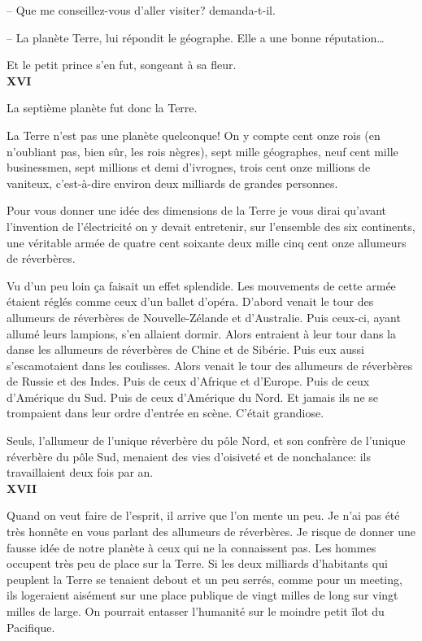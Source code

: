 \begin{Parallel}[p]{}{}
{-- Que me conseillez-vous d'aller visiter? demanda-t-il.

-- La planète Terre, lui répondit le géographe.
Elle a une bonne réputation\ldots{}

Et le petit prince s'en fut, songeant à sa fleur.\\

\textbf{XVI}

La septième planète fut donc la Terre.

La Terre n'est pas une planète quelconque! On y
compte cent onze rois (en n'oubliant pas, bien sûr,
les rois nègres), sept mille géographes, neuf cent
mille businessmen, sept millions et demi d'ivrognes,
trois cent onze millions de vaniteux, c'est-à-dire
environ deux milliards de grandes personnes.

Pour vous donner une idée des dimensions de la
Terre je vous dirai qu'avant l'invention de l'électricité
on y devait entretenir, sur l'ensemble des six continents, une véritable armée de quatre cent soixante
deux mille cinq cent onze allumeurs de réverbères.

Vu d'un peu loin ça faisait un effet splendide. Les
mouvements de cette armée étaient réglés comme
ceux d'un ballet d'opéra. D'abord venait le tour des
allumeurs de réverbères de Nouvelle-Zélande et
d'Australie. Puis ceux-ci, ayant allumé leurs lampions,
s'en allaient dormir. Alors entraient à leur tour dans la
danse les allumeurs de réverbères de Chine et de Sibérie.
Puis eux aussi s'escamotaient dans les coulisses.
Alors venait le tour des allumeurs de réverbères de
Russie et des Indes. Puis de ceux d'Afrique et d'Europe. Puis de ceux d'Amérique du Sud. Puis de ceux
d'Amérique du Nord. Et jamais ils ne se trompaient
dans leur ordre d'entrée en scène. C'était grandiose.

Seuls, l'allumeur de l'unique réverbère du pôle
Nord, et son confrère de l'unique réverbère du pôle
Sud, menaient des vies d'oisiveté et de nonchalance: ils travaillaient deux fois par an.\\

\textbf{XVII}

Quand on veut faire de l'esprit, il arrive que l'on
mente un peu. Je n'ai pas été très honnête en vous
parlant des allumeurs de réverbères. Je risque de
donner une fausse idée de notre planète à ceux qui
ne la connaissent pas. Les hommes occupent très
peu de place sur la Terre. Si les deux milliards d'habitants qui peuplent la Terre se tenaient debout et
un peu serrés, comme pour un meeting, ils logeraient aisément sur une place publique de vingt
milles de long sur vingt milles de large. On pourrait
entasser l'humanité sur le moindre petit îlot du
Pacifique.

}
\end{Parallel}
